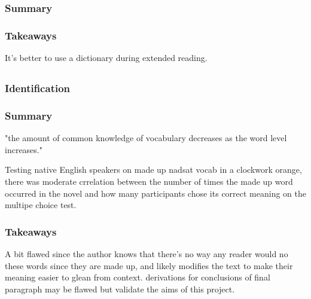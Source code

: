 \documentclass[
	letterpaper, %
]{jdf}
\begin{document}
\subsubsection{Summary}

\subsubsection{Takeaways}
It's better to use a dictionary during extended reading.

\subsection{}
\subsubsection{Identification}

\subsubsection{Summary}
"the amount of common knowledge of vocabulary decreases as the word level increases."

Testing native English speakers on made up nadsat vocab in a clockwork orange, there was moderate crrelation between the number of times the made up word occurred in the novel and how many participants chose its correct meaning on the multipe choice test.
\subsubsection{Takeaways}
A bit flawed since the author knows that there's no way any reader would no these words since they are made up, and likely modifies the text to make their meaning easier to glean from context. derivations for conclusions of final paragraph may be flawed but validate the aims of this project.


\subsection{}
\end{document}

